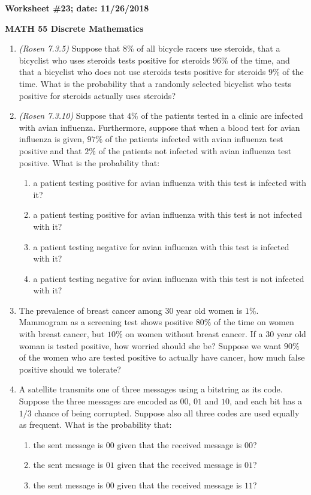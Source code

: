 \documentclass{article}
\begin{document}
{\bf Worksheet \#23; date: 11/26/2018}

{\bf MATH 55 Discrete Mathematics}

\begin{enumerate}
\item {\em (Rosen 7.3.5)} Suppose that $8\%$ of all bicycle racers use steroids, that a bicyclist who uses steroids tests positive for steroids $96\%$ of the time, and that a bicyclist who does not use steroids tests positive for steroids $9\%$ of the time. What is the probability that a randomly selected bicyclist who tests positive for steroids actually uses steroids?

\item {\em (Rosen 7.3.10)} Suppose that $4\%$ of the patients tested in a clinic are infected with avian influenza. Furthermore, suppose that when a blood test for avian influenza is given, $97\%$ of the patients infected with avian influenza test positive and that $2\%$ of the patients not infected with avian influenza test positive. What is the probability that:
\begin{enumerate}
	\item a patient testing positive for avian influenza with this test is infected with it?
	\item a patient testing positive for avian influenza with this test is not infected with it?
	\item a patient testing negative for avian influenza with this test is infected with it?
	\item a patient testing negative for avian influenza with this test is not infected with it?
\end{enumerate}

\item The prevalence of breast cancer among $30$ year old women is $1\%$. Mammogram as a screening test shows positive $80\%$ of the time on women with breast cancer, but $10\%$ on women without breast cancer. If a $30$ year old woman is tested positive, how worried should she be? Suppose we want $90\%$ of the women who are tested positive to actually have cancer, how much false positive should we tolerate?

\item A satellite transmits one of three messages using a bitstring as its code. Suppose the three messages are encoded as $00$, $01$ and $10$, and each bit has a $1/3$ chance of being corrupted. Suppose also all three codes are used equally as frequent. What is the probability that:
\begin{enumerate}
	\item the sent message is $00$ given that the received message is $00$?
	\item the sent message is $01$ given that the received message is $01$?
	\item the sent message is $00$ given that the received message is $11$?
\end{enumerate}
\end{enumerate}
\end{document}

